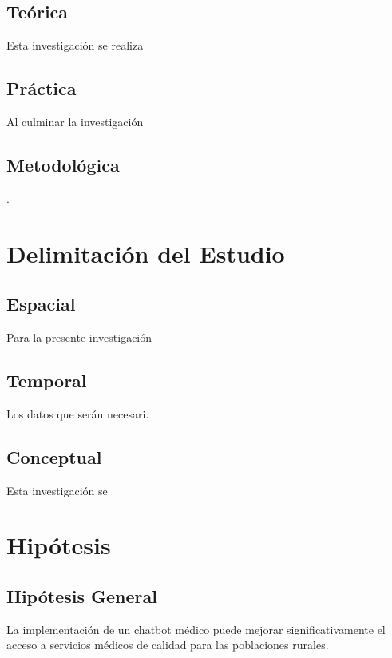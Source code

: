 \subsection{Teórica}
Esta investigación se realiza 

\subsection{Práctica}
Al culminar la investigación 

\subsection{Metodológica}. 

\section{Delimitación del Estudio}

\subsection{Espacial}
Para la presente investigación 

\subsection{Temporal}
Los datos que serán necesari. 

\subsection{Conceptual}
Esta investigación se 

\section{Hipótesis}

\subsection{Hipótesis General}
\newcommand{\HipotesisGeneral}{
La implementación de un chatbot médico puede mejorar significativamente el acceso a servicios médicos de calidad para las poblaciones rurales.
}
\HipotesisGeneral
